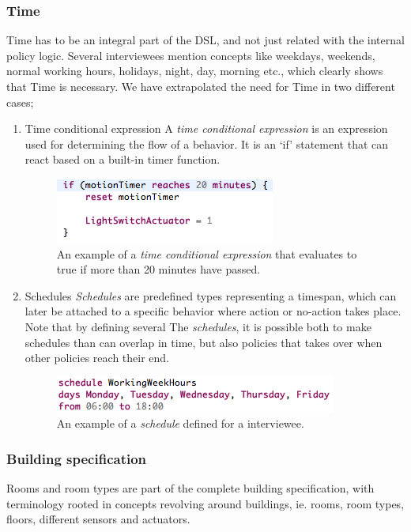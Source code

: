 \subsubsection{Time}\label{subsec:time}
Time has to be an integral part of the DSL, and not just related with the internal policy logic. Several interviewees mention concepts like weekdays, weekends, normal working hours, holidays, night, day, morning etc., which clearly shows that Time is necessary. We have extrapolated the need for Time in two different cases;
\begin{enumerate}
	\item Time conditional expression\label{subsubsec:conditionalexpression}
A \textit{time conditional expression} is an expression used for determining the flow of a behavior. It is an `if' statement that can react based on a built-in timer function. 

\begin{figure}[h]
  \centering
    \includegraphics[scale=.5]{dsl-conditional-time-expression.png}
	\caption{An example of a \textit{time conditional expression} that evaluates to true if more than 20 minutes have passed.}
	\label{fig:dsl-conditionalexpression}
\end{figure}

\item Schedules\label{subsubsec:schedules}
\textit{Schedules} are predefined types representing a timespan, which can later be attached to a specific behavior where action or no-action takes place. Note that by defining several The \textit{schedules}, it is possible both to make schedules than can overlap in time, but also policies that takes over when other policies reach their end. 

\begin{figure}
  \centering
  \includegraphics[scale=.5]{dsl-schedules.png}
  \caption{An example of a \textit{schedule} defined for a interviewee.}
  \label{fig:dsl-schedules}
\end{figure}
\end{enumerate}
\subsubsection{Building specification}\label{subsec:buildingspecification}
Rooms and room types are part of the complete building specification, with terminology rooted in concepts revolving around buildings, ie. rooms, room types, floors, different sensors and actuators. \\

